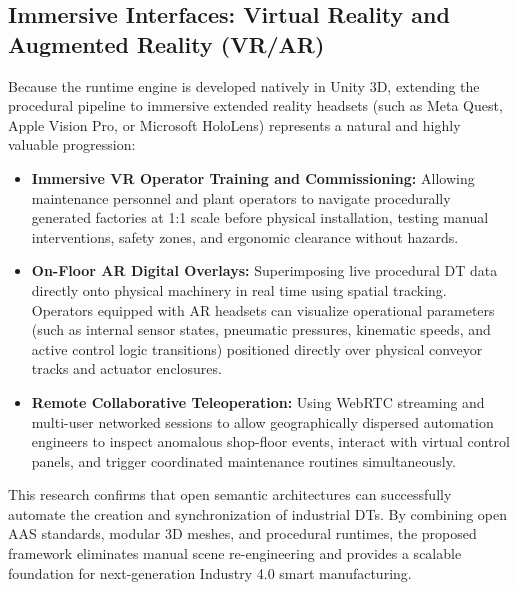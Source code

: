 \subsection{Immersive Interfaces: Virtual Reality and Augmented Reality (\texorpdfstring{\gls{VR}}{VR}/\texorpdfstring{\gls{AR}}{AR})}
Because the runtime engine is developed natively in Unity 3D, extending the procedural pipeline to immersive extended reality headsets (such as Meta Quest, Apple Vision Pro, or Microsoft HoloLens) represents a natural and highly valuable progression:
\begin{itemize}
    \item \textbf{Immersive \gls{VR} Operator Training and Commissioning:} Allowing maintenance personnel and plant operators to navigate procedurally generated factories at 1:1 scale before physical installation, testing manual interventions, safety zones, and ergonomic clearance without hazards.
    \item \textbf{On-Floor \gls{AR} Digital Overlays:} Superimposing live procedural \gls{DT} data directly onto physical machinery in real time using spatial tracking. Operators equipped with \gls{AR} headsets can visualize operational parameters (such as internal sensor states, pneumatic pressures, kinematic speeds, and active control logic transitions) positioned directly over physical conveyor tracks and actuator enclosures.
    \item \textbf{Remote Collaborative Teleoperation:} Using WebRTC streaming and multi-user networked sessions to allow geographically dispersed automation engineers to inspect anomalous shop-floor events, interact with virtual control panels, and trigger coordinated maintenance routines simultaneously.
\end{itemize}

This research confirms that open semantic architectures can successfully automate the creation and synchronization of industrial \glspl{DT}. By combining open \gls{AAS} standards, modular 3D meshes, and procedural runtimes, the proposed framework eliminates manual scene re-engineering and provides a scalable foundation for next-generation Industry 4.0 smart manufacturing.